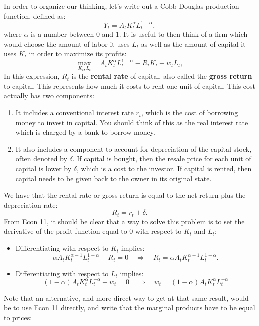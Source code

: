 \documentclass[]{book}
\providecommand{\tightlist}{%
  \setlength{\itemsep}{0pt}\setlength{\parskip}{0pt}}
\theoremstyle{definition}
\theoremstyle{definition}
\theoremstyle{definition}
\theoremstyle{remark}
\begin{document}
In order to organize our thinking, let's write out a Cobb-Douglas
production function, defined as:
\[Y_t = A_t K_t^{\alpha} L_t^{1-\alpha},\] where \(\alpha\) is a number
between \(0\) and \(1\). It is useful to then think of a firm which
would choose the amount of labor it uses \(L_t\) as well as the amount
of capital it uses \(K_t\) in order to maximize its profits:
\[\max_{K_t, L_t} \quad A_t K_t^{\alpha} L_t^{1-\alpha} - R_t K_t - w_t L_t,\]
In this expression, \(R_t\) is the \textbf{rental rate} of capital, also
called the \textbf{gross return} to capital. This represents how much it
costs to rent one unit of capital. This cost actually has two
components:

\begin{enumerate}
\def\labelenumi{\arabic{enumi}.}
\item
  It includes a conventional interest rate \(r_t\), which is the cost of
  borrowing money to invest in capital. You should think of this as the
  real interest rate which is charged by a bank to borrow money.
\item
  It also includes a component to account for depreciation of the
  capital stock, often denoted by \(\delta\). If capital is bought, then
  the resale price for each unit of capital is lower by \(\delta\),
  which is a cost to the investor. If capital is rented, then capital
  needs to be given back to the owner in its original state.
\end{enumerate}

We have that the rental rate or gross return is equal to the net return
plus the depreciation rate: \[\boxed{R_t = r_t + \delta}.\] From Econ
11, it should be clear that a way to solve this problem is to set the
derivative of the profit function equal to \(0\) with respect to \(K_t\)
and \(L_t\):

\begin{itemize}
\tightlist
\item
  Differentiating with respect to \(K_t\) implies:
  \[\alpha A_t K_t^{\alpha-1} L_t^{1-\alpha} - R_t = 0 \quad \Rightarrow \quad \boxed{R_t = \alpha A_t K_t^{\alpha-1} L_t^{1-\alpha}}.\]
\item
  Differentiating with respect to \(L_t\) implies:
  \[(1-\alpha) A_t K_t^{\alpha} L_t^{-\alpha} - w_t = 0 \quad \Rightarrow \quad \boxed{w_t = (1-\alpha) A_t K_t^{\alpha} L_t^{-\alpha}}\]
\end{itemize}

Note that an alternative, and more direct way to get at that same
result, would be to use Econ 11 directly, and write that the marginal
products have to be equal to prices:
\end{document}
